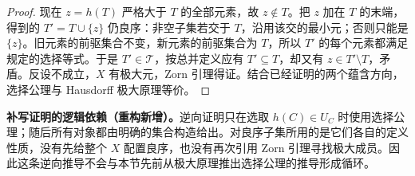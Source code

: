 \documentclass[../../main.tex]{subfiles}%
\begin{document}
\begin{proof}
现在 $z=h(T)$ 严格大于 $T$ 的全部元素，故 $z\notin T$。把 $z$ 加在 $T$ 的末端，得到的 $T'=T\cup\{z\}$ 仍良序：非空子集若交于 $T$，沿用该交的最小元；否则只能是 $\{z\}$。旧元素的前驱集合不变，新元素的前驱集合为 $T$，所以 $T'$ 的每个元素都满足规定的选择等式。于是 $T'\in\mathscr{T}$，按总并定义应有 $T'\subseteq T$，却又有 $z\in T'\setminus T$，矛盾。反设不成立，$X$ 有极大元，Zorn 引理得证。结合已经证明的两个蕴含方向，选择公理与 Hausdorff 极大原理等价。
\end{proof}
\begin{remark}
\textbf{补写证明的逻辑依赖（重构新增）。}逆向证明只在选取 $h(C)\in U_C$ 时使用选择公理；随后所有对象都由明确的集合构造给出。对良序子集所用的是它们各自的定义性质，没有先给整个 $X$ 配置良序，也没有再次引用 Zorn 引理寻找极大成员。因此这条逆向推导不会与本节先前从极大原理推出选择公理的推导形成循环。
\end{remark}
\end{document}
